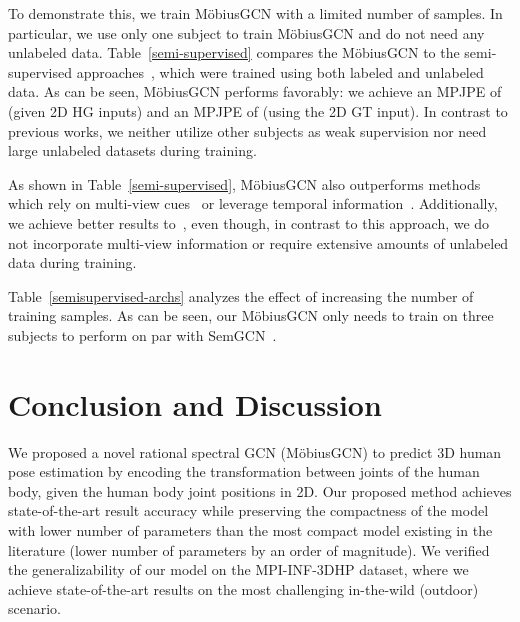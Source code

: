 \documentclass[runningheads]{llncs}
\begin{document}
To demonstrate this, we train M\"obiusGCN with a limited number of samples. In particular, we use only one subject to train M\"obiusGCN and do not need any unlabeled data.
Table~\ref{semi-supervised} compares the M\"obiusGCN to the semi-supervised approaches~\cite{rhodin2018unsupervised, chen2019weakly,pavlakos2019texturepose,li2019boosting, iqbal2020weakly}, which were trained using both labeled and unlabeled data.
As can be seen, M\"obiusGCN performs favorably: we achieve an MPJPE of  (given 2D HG inputs) and an MPJPE of  (using the 2D GT input). In contrast to previous works, we neither utilize other subjects as weak supervision nor need large unlabeled datasets during training. 

As shown in Table~\ref{semi-supervised}, M\"obiusGCN also outperforms methods which rely on multi-view cues~\cite{rhodin2018unsupervised, chen2019weakly} or leverage temporal information~\cite{li2019boosting}.
Additionally, we achieve better results to~\cite{iqbal2020weakly}, even though, in contrast to this approach, we do not incorporate multi-view information or require extensive amounts of unlabeled data during training.

Table~\ref{semisupervised-archs} analyzes the effect of increasing the number of training samples.
As can be seen, our M\"obiusGCN only needs to train on three subjects to perform on par with SemGCN~\cite{zhaoCVPR19semantic}.
\vspace{-5px}
\begin{center}
\label{semisupervised-archs}
 \end{center}
\vspace{-17px}
\section{Conclusion and Discussion}
\vspace{-5px}
We proposed a novel rational spectral GCN (M\"obiusGCN) to predict 3D human pose estimation by encoding the transformation between joints of the human body, given the human body joint positions in 2D. Our proposed method achieves state-of-the-art result accuracy while preserving the compactness of the model with lower number of parameters than the most compact model existing in the literature (lower number of parameters by an order of magnitude).
We verified the generalizability of our model on the MPI-INF-3DHP dataset, where we achieve state-of-the-art results on the most challenging in-the-wild (outdoor) scenario.
\end{document}
